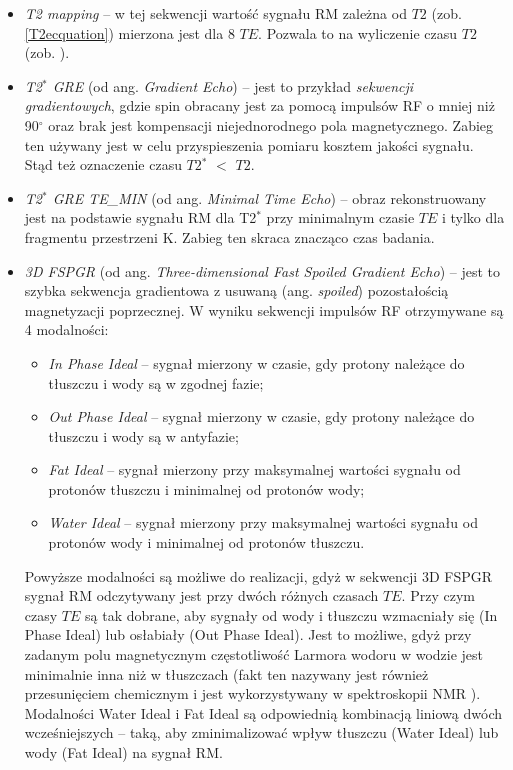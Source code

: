\begin{itemize}[noitemsep,nolistsep]
	\item \textit{T2 mapping} -- w tej sekwencji wartość sygnału RM zależna od $T2$ (zob. \ref{T2ecquation}) mierzona jest dla 8 $TE$. Pozwala to na wyliczenie czasu $T2$ (zob. \cite{Regulski2017}).
	\item \textit{T2$^\ast$ GRE} (od ang. \textit{Gradient Echo}) -- jest to przykład \textit{sekwencji gradientowych}, gdzie spin obracany jest za pomocą impulsów RF o mniej niż 90$^\circ$ oraz brak jest kompensacji niejednorodnego pola magnetycznego. Zabieg ten używany jest w celu przyspieszenia pomiaru kosztem jakości sygnału. Stąd też oznaczenie czasu $T2$$^\ast$ $<$ $T2$. 
	\item \textit{T2$^\ast$ GRE TE\_MIN} (od ang. \textit{Minimal Time Echo}) -- obraz rekonstruowany jest na podstawie sygnału RM dla T2$^\ast$  przy minimalnym czasie $TE$ i tylko dla fragmentu przestrzeni K. Zabieg ten skraca znacząco czas badania.
	\item \textit{3D FSPGR} (od ang. \textit{Three-dimensional Fast Spoiled Gradient Echo}) -- jest to szybka sekwencja gradientowa z usuwaną (ang. \textit{spoiled}) pozostałością magnetyzacji poprzecznej. W wyniku sekwencji impulsów RF otrzymywane są 4 modalności: 
	\begin{itemize}[noitemsep,nolistsep]
		\item \textit{In Phase Ideal} -- sygnał mierzony w czasie, gdy protony należące do tłuszczu i wody są w zgodnej fazie;
		\item \textit{Out Phase Ideal} -- sygnał mierzony w czasie, gdy protony należące \linebreak do tłuszczu i wody są w antyfazie;
		\item \textit{Fat Ideal} -- sygnał mierzony przy maksymalnej wartości sygnału od protonów tłuszczu i minimalnej od protonów wody;
		\item \textit{Water Ideal} -- sygnał mierzony przy maksymalnej wartości sygnału \linebreak od protonów wody i minimalnej od protonów tłuszczu.
	\end{itemize}
	Powyższe modalności są możliwe do realizacji, gdyż w sekwencji 3D FSPGR sygnał RM odczytywany jest przy dwóch różnych czasach $TE$. Przy czym czasy $TE$ są tak dobrane, aby sygnały od wody i tłuszczu wzmacniały się (In Phase Ideal) lub osłabiały (Out Phase Ideal). Jest to możliwe, gdyż przy zadanym polu magnetycznym częstotliwość Larmora wodoru w wodzie jest minimalnie inna niż w tłuszczach (fakt ten nazywany jest również przesunięciem chemicznym i jest wykorzystywany w spektroskopii NMR \cite{lide2006crc}). Modalności Water Ideal i Fat Ideal są odpowiednią kombinacją liniową dwóch wcześniejszych -- taką, aby zminimalizować wpływ tłuszczu (Water Ideal) lub wody (Fat Ideal) na sygnał RM.
\end{itemize}

